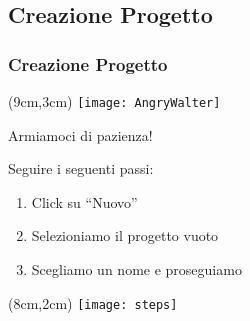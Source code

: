 \subsection{Creazione Progetto}
\begin{frame}
  \frametitle{Creazione Progetto}
  
    \begin{textblock*}{5cm}(9cm,3cm)
      \texttt{[image: AngryWalter]}
    \end{textblock*}
    
    \huge Armiamoci di pazienza!
\end{frame}

\begin{frame}
 
 Seguire i seguenti passi:
 \begin{enumerate}
  \item<1-> Click su ``Nuovo''
  \item<2-> Selezioniamo il progetto vuoto
  \item<3-> Scegliamo un nome e proseguiamo
 \end{enumerate}

 \begin{textblock*}{5cm}(8cm,2cm)
      \texttt{[image: steps]}
 \end{textblock*}
   
\end{frame}